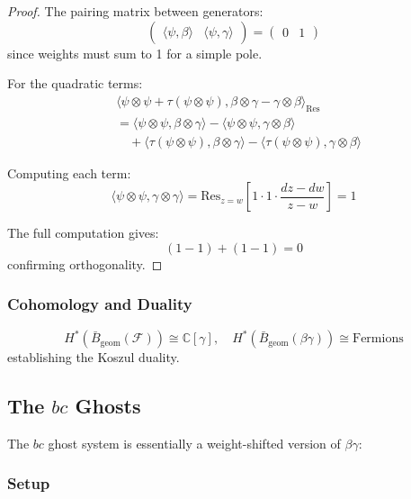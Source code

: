 \begin{proof}
The pairing matrix between generators:
\[
\begin{pmatrix}
\langle \psi, \beta \rangle & \langle \psi, \gamma \rangle
\end{pmatrix} = 
\begin{pmatrix}
0 & 1
\end{pmatrix}
\]
since weights must sum to 1 for a simple pole.
 
For the quadratic terms:
\begin{align}
&\langle \psi \otimes \psi + \tau(\psi \otimes \psi), \beta \otimes \gamma - \gamma \otimes \beta \rangle_{\text{Res}} \\
&= \langle \psi \otimes \psi, \beta \otimes \gamma \rangle - \langle \psi \otimes \psi, \gamma \otimes \beta \rangle \\
&\quad + \langle \tau(\psi \otimes \psi), \beta \otimes \gamma \rangle - \langle \tau(\psi \otimes \psi), \gamma \otimes \beta \rangle
\end{align}
 
Computing each term:
\[
\langle \psi \otimes \psi, \gamma \otimes \gamma \rangle = \text{Res}_{z=w}\left[1 \cdot 1 \cdot \frac{dz-dw}{z-w}\right] = 1
\]
 
The full computation gives:
\[
(1 - 1) + (1 - 1) = 0
\]
confirming orthogonality.
\end{proof}
 
\subsubsection{Cohomology and Duality}
 
\begin{theorem}
\[
H^*(\bar{B}_{\text{geom}}(\mathcal{F})) \cong \mathbb{C}[\gamma], \quad 
H^*(\bar{B}_{\text{geom}}(\beta\gamma)) \cong \text{Fermions}
\]
establishing the Koszul duality.
\end{theorem}
 
\subsection{The $bc$ Ghosts}
 
The $bc$ ghost system is essentially a weight-shifted version of $\beta\gamma$:
 
\subsubsection{Setup}
 
